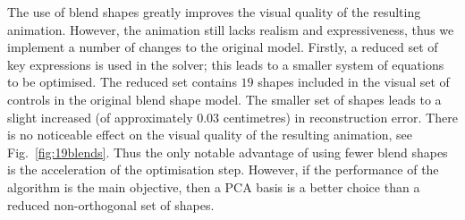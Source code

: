 \documentclass[11pt]{report}
\begin{document}
The use of blend shapes greatly improves the visual quality of the resulting animation. However, the animation still lacks realism and expressiveness, thus we implement a number of changes to the original model. Firstly, a reduced set of key expressions is used in the solver; this leads to a smaller system of equations to be optimised. The reduced set contains $19$ shapes included in the visual set of controls in the original blend shape model. The smaller set of shapes leads to a slight increased (of approximately $0.03$ centimetres) in reconstruction error. There is no noticeable effect on the visual quality of the resulting animation, see Fig.~\ref{fig:19blends}. Thus the only notable advantage of using fewer blend shapes is the acceleration of the  optimisation step. However, if the performance of the algorithm is the main objective, then a PCA basis is a better choice than a reduced non-orthogonal set of shapes.
\end{document}

